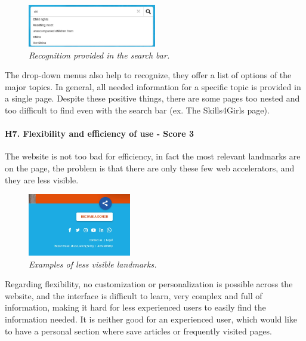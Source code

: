 \begin{figure}[!h]
	\begin{center}
		\includegraphics[width=0.5\textwidth]{FinalScores12.jpg}
		\captionsetup{font=small}
		\caption{\textit{Recognition provided in the search bar.}}
	\end{center}
\end{figure}
\newline The drop-down menus also help to recognize, they offer a list of options of the major topics.
\newline In general, all needed information for a specific topic is provided in a single page.
\newline Despite these positive things, there are some pages too nested and too difficult to find even with the search bar (ex. The Skills4Girls page).
\newline
\newline \paragraph{H7. Flexibility and efficiency of use - Score 3} \label{subsec:H7}	The website is not too bad for efficiency, in fact the most relevant landmarks are on the page, the problem is that there are only these few web accelerators, and they are less visible.
\begin{figure}[!h]
	\begin{center}
		\includegraphics[width=0.4\textwidth]{FinalScores13.jpg}
		\captionsetup{font=small}
		\caption{\textit{Examples of less visible landmarks.}}
	\end{center}
\end{figure}
\newline Regarding flexibility, no customization or personalization is possible across the website, and the interface is difficult to learn, very complex and full of information, making it hard for less experienced users to easily find the information needed. It is neither good for an experienced user, which would like to have a personal section where save articles or frequently visited pages.
